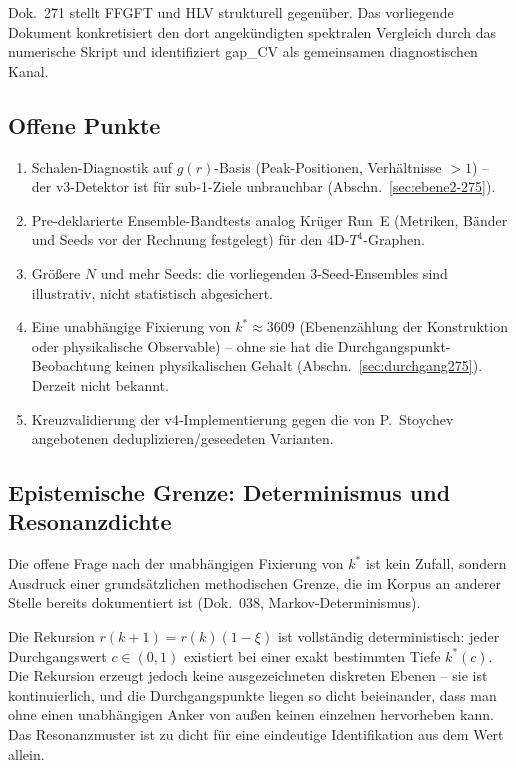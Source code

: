 Dok.~271 stellt FFGFT und HLV strukturell gegenüber. Das vorliegende
Dokument konkretisiert den dort angekündigten spektralen Vergleich durch
das numerische Skript und identifiziert gap\_CV als gemeinsamen
diagnostischen Kanal.

\subsection{Offene Punkte}

\begin{enumerate}
  \item Schalen-Diagnostik auf $g(r)$-Basis (Peak-Positionen,
        Verhältnisse $>1$) -- der v3-Detektor ist für sub-1-Ziele
        unbrauchbar (Abschn.~\ref{sec:ebene2-275}).
  \item Pre-deklarierte Ensemble-Bandtests analog Krüger Run~E
        (Metriken, Bänder und Seeds vor der Rechnung festgelegt)
        für den 4D-$T^4$-Graphen.
  \item Größere $N$ und mehr Seeds: die vorliegenden 3-Seed-Ensembles
        sind illustrativ, nicht statistisch abgesichert.
  \item Eine unabhängige Fixierung von $k^* \approx 3609$ (Ebenenzählung
        der Konstruktion oder physikalische Observable) -- ohne sie hat
        die Durchgangspunkt-Beobachtung keinen physikalischen Gehalt
        (Abschn.~\ref{sec:durchgang275}). Derzeit nicht bekannt.
  \item Kreuzvalidierung der v4-Implementierung gegen die von
        P.~Stoychev angebotenen deduplizieren/geseedeten Varianten.
\end{enumerate}

\subsection{Epistemische Grenze: Determinismus und Resonanzdichte}

Die offene Frage nach der unabhängigen Fixierung von $k^*$ ist kein
Zufall, sondern Ausdruck einer grundsätzlichen methodischen Grenze,
die im Korpus an anderer Stelle bereits dokumentiert ist
(Dok.~038, Markov-Determinismus).

Die Rekursion $r(k{+}1) = r(k)(1-\xi)$ ist vollständig deterministisch:
jeder Durchgangswert $c\in(0,1)$ existiert bei einer exakt bestimmten
Tiefe $k^*(c)$. Die Rekursion erzeugt jedoch keine ausgezeichneten
diskreten Ebenen -- sie ist kontinuierlich, und die Durchgangspunkte
liegen so dicht beieinander, dass man ohne einen unabhängigen Anker
von außen keinen einzelnen hervorheben kann. Das Resonanzmuster ist zu
dicht für eine eindeutige Identifikation aus dem Wert allein.

